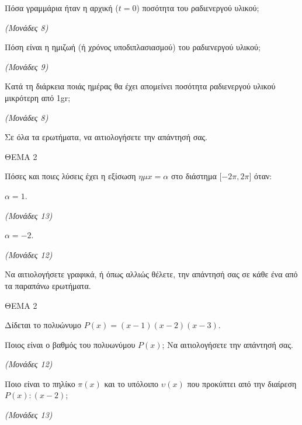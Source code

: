 \documentclass[11pt,a4paper,twoside]{book}
\newcommand{\monades}[1]{\hfill \textit{(Μονάδες #1)}}
\begin{document}
\begin{alist}
\item Πόσα γραμμάρια ήταν η αρχική ($t = 0$) ποσότητα του ραδιενεργού υλικού;

\monades{8}

\item Πόση είναι η ημιζωή (ή χρόνος υποδιπλασιασμού) του ραδιενεργού υλικού;

\monades{9}

\item Κατά τη διάρκεια ποιάς ημέρας θα έχει απομείνει ποσότητα ραδιενεργού υλικού μικρότερη από 1gr;

\monades{8}

Σε όλα τα ερωτήματα, να αιτιολογήσετε την απάντησή σας.
\end{alist}

\vspace{4mm}

ΘΕΜΑ 2

Πόσες και ποιες λύσεις έχει η εξίσωση $\eta\mu x = \alpha$ στο διάστημα $\lbrack - 2\pi,2\pi\rbrack$ όταν:

\begin{alist}
\item $\alpha = 1$.

\monades{13}

\item $\alpha = - 2$.

\monades{12}

Να αιτιολογήσετε γραφικά, ή όπως αλλιώς θέλετε, την απάντησή σας σε κάθε ένα από τα παραπάνω ερωτήματα.
\end{alist}

\vspace{4mm}

ΘΕΜΑ 2

Δίδεται το πολυώνυμο $P(x) = (x - 1)(x - 2)(x - 3)$.

\begin{alist}
\item Ποιος είναι ο βαθμός του πολυωνύμου $P(x)$; Να αιτιολογήσετε την απάντησή σας.

\monades{12}

\item Ποιο είναι το πηλίκο $\pi(x)$ και το υπόλοιπο $\upsilon(x)$ που προκύπτει από την διαίρεση $P(x):(x - 2)$;

\monades{13}
\end{alist}

\vspace{4mm}
\end{document}

